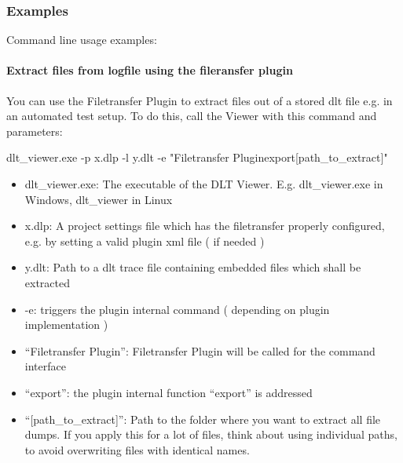 \documentclass[a4paper,11pt]{article}
\begin{document}
\subsubsection{Examples}



\par
Command line usage examples:


\paragraph{Extract files from logfile using the fileransfer plugin}

You can use the Filetransfer Plugin to extract files out of a stored dlt file e.g. in an automated test setup.
To do this, call the Viewer with this command and parameters:

dlt\_viewer.exe -p x.dlp -l y.dlt -e "Filetransfer Plugin{\textbar}export{\textbar}[path\_to\_extract]"


\begin{itemize}
    \item dlt\_viewer.exe:\linebreak
    The executable of the DLT Viewer. E.g. dlt\_viewer.exe in Windows, dlt\_viewer in Linux
    \item x.dlp:\linebreak
    A project settings file which has the filetransfer properly configured, e.g. by setting a valid plugin xml file ( if needed )
    \item y.dlt:\linebreak
    Path to a dlt trace file containing embedded files which shall be extracted
    \item -e:\linebreak
    triggers the plugin internal command ( depending on plugin implementation )
    \item ``Filetransfer Plugin'':\linebreak
    Filetransfer Plugin will be called for the command interface
    \item ``export'':\linebreak
    the plugin internal function ``export'' is addressed
    \item ``[path\_to\_extract]'':\linebreak
    Path to the folder where you want to extract all file dumps. If you apply this for a lot of files,
    think about using individual paths, to avoid overwriting files with identical names.
\end{itemize}
\end{document}
